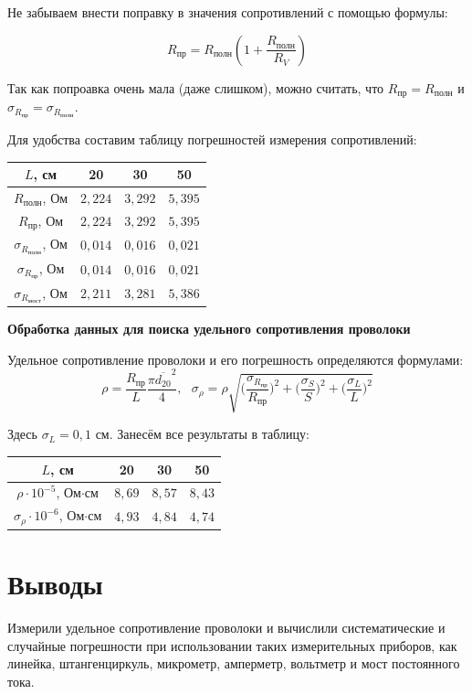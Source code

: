 \documentclass[a4paper, 12pt]{article} %
\begin{document}
Не забываем внести поправку в значения сопротивлений с помощью формулы:

\[R_{\text{пр}} = R_{\text{полн}} (1 + \frac{R_{\text{полн}}}{R_V})\]

Так как попроавка очень мала (даже слишком), можно считать, что $R_{\text{пр}} = R_{\text{полн}}$ и $\sigma_{R_{\text{пр}}} = \sigma_{R_{\text{полн}}}$.

Для удобства составим таблицу погрешностей измерения сопротивлений:
\begin{center}
\begin{tabular}{|c|c|c|c|}
\hline 
$L$, см & 20 & 30 & 50 \\ 
\hline 
$R_{\text{полн}}$, Ом & $2,224$ & $3,292$ & $5,395$ \\ 
\hline 
$R_{\text{пр}}$, Ом & $2,224$ & $3,292$ & $5,395$ \\ 
\hline 
$\sigma_{R_{\text{полн}}}$, Ом & $0,014$ & $0,016$ & $0,021$ \\ 
\hline 
$\sigma_{R_{\text{пр}}}$, Ом & $0,014$ & $0,016$ & $0,021$ \\ 
\hline 
$\sigma_{R_{\text{мост}}}$, Ом & $2,211$ & $3,281$ & $5,386$ \\ 
\hline  
\end{tabular} 
\end{center}
\newpage
\begin{center}
 \textbf{Обработка данных для поиска удельного сопротивления проволоки}
\end{center}

Удельное сопротивление проволоки и его погрешность определяются формулами:
\[\rho = \frac{R_{\text{пр}}}{L} \frac{\pi \overline{d_{20}}^2}{4}, \text{ } \sigma_{\rho} = \rho \sqrt{\Big( \frac{\sigma_{R_{\text{пр}}}}{R_{\text{пр}}}\Big) ^2 + \Big(\frac{\sigma_S}{S} \Big)^2 + \Big(\frac{\sigma_L}{L} \Big)^2}\]

Здесь $\sigma_{L} = 0,1$ см.
Занесём все результаты в таблицу:
\begin{center}
\begin{tabular}{|c|c|c|c|}
\hline 
$L$, см & 20 & 30 & 50 \\ 
\hline 
$\rho \cdot 10^{-5}$, Ом$\cdot$см & $8,69$ & $8,57$ & $8,43$ \\ 
\hline 
$\sigma_{\rho}\cdot 10^{-6}$, Ом$\cdot$см & $4,93$ & $4,84$ & $4,74$ \\ 
\hline 
\end{tabular} 
\end{center}

\section{Выводы}

Измерили удельное сопротивление проволоки и вычислили систематические и случайные погрешности при использовании таких измерительных приборов, как линейка, штангенциркуль, микрометр, амперметр, вольтметр и мост постоянного тока.
\end{document}

